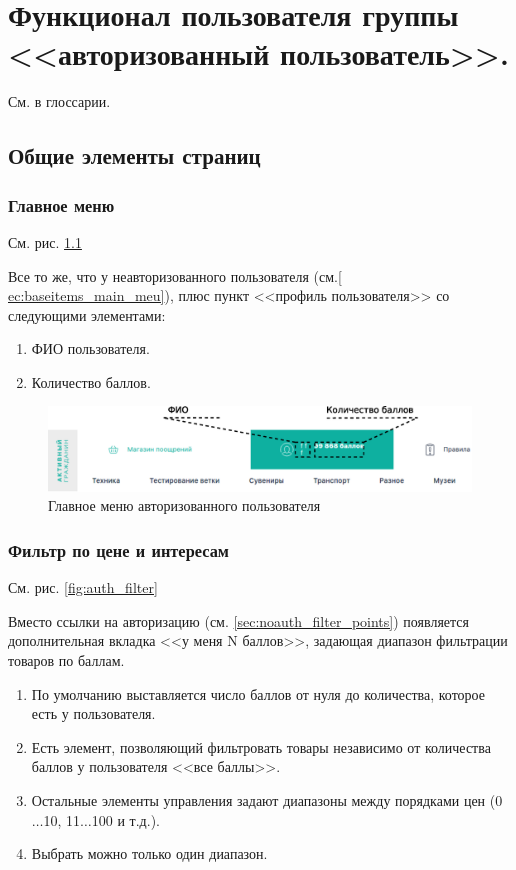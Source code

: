 \chapter{Функционал пользователя группы <<авторизованный пользователь>>.}

См.  в глоссарии.

\section{Общие элементы страниц}
\subsection{Главное меню}

См. рис. \ref{fig:auth_main_menu}

Все то же, что у неавторизованного пользователя (см.\ref{
ec:baseitems_main_meu}), плюс пункт <<профиль пользователя>> со
следующими элементами: 
\begin{enumerate}
\item ФИО пользователя.
\item Количество баллов.
\end{enumerate}


        \begin{figure}
            \center
            \includegraphics[width=170mm]{04_auth_funcs/figures/01.eps}
            \caption{Главное меню авторизованного пользователя}
            \label{fig:auth_main_menu}
        \end{figure}
        
        \subsection{Фильтр по цене и интересам}

            См. рис. \ref{fig:auth_filter}

            Вместо ссылки на авторизацию (см. 
            \ref{sec:noauth_filter_points}) появляется дополнительная вкладка
            <<у меня N баллов>>, задающая диапазон фильтрации товаров по 
            баллам.
            
            \begin{enumerate}
                \item По умолчанию выставляется число баллов от нуля до 
                количества, которое есть у пользователя.
                \item Есть элемент, позволяющий фильтровать товары 
                независимо от количества баллов у пользователя <<все баллы>>.
                \item Остальные элементы управления задают диапазоны между 
                порядками цен (0$\dots$10, 11$\dots$100 и т.д.).
                \item Выбрать можно только один диапазон.
            \end{enumerate}

